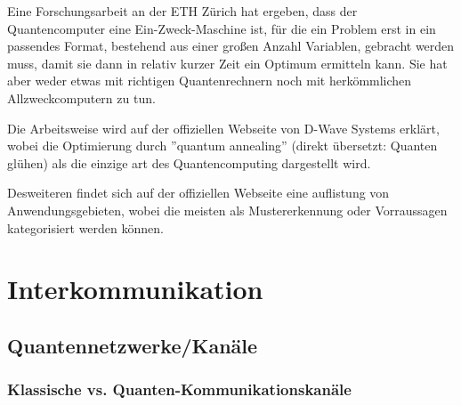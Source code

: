 
Eine Forschungsarbeit an der ETH Zürich hat ergeben, dass der Quantencomputer eine Ein-Zweck-Maschine ist, für die ein Problem erst in ein passendes Format, bestehend aus einer großen Anzahl Variablen, gebracht werden muss, damit sie dann in relativ kurzer Zeit ein Optimum ermitteln kann. Sie hat aber weder etwas mit richtigen Quantenrechnern noch mit herkömmlichen Allzweckcomputern zu tun.


Die Arbeitsweise wird auf der offiziellen Webseite von D-Wave Systems erklärt, wobei die Optimierung durch ''quantum annealing'' (direkt übersetzt: Quanten glühen) als die einzige art des Quantencomputing dargestellt wird.


Desweiteren findet sich auf der offiziellen Webseite eine auflistung von Anwendungsgebieten, wobei die meisten als Mustererkennung oder Vorraussagen kategorisiert werden können.









\newpage

\section{Interkommunikation}
\label{sec:interkommunikation}

\subsection{Quantennetzwerke/Kanäle}
\label{sec:Quantennetzwerke/Kanaele}

\subsubsection{Klassische vs. Quanten-Kommunikationskanäle}
\label{sec:Klassische vs. Quanten-Kommunikationskanaele}

